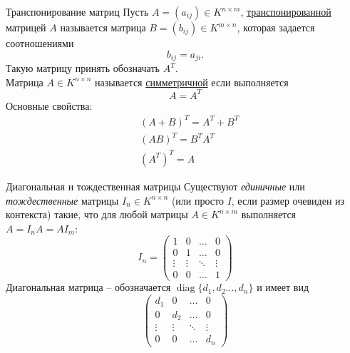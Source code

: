\documentclass[10pt, handout]{beamer}
\DeclareMathOperator{\diag}{diag}
\begin{document}
\begin{frame}{Транспонирование матриц}
Пусть $A=(a_{ij})\in K^{n\times m}$, \underline{транспонированной} матрицей $A$ называется матрица $B=(b_{ij})\in K^{m\times n}$, которая задается соотношениями
$$
b_{ij}=a_{ji}.
$$
Такую матрицу принять обозначать $A^T$.\\
\vspace{1em}
\pause
Матрица $A\in K^{n\times n}$ называется \underline{симметричной} если выполняется
$$
A=A^T
$$
\pause
Основные свойства:
\begin{align*}
&(A+B)^T=A^T+B^T\\
&(AB)^T=B^TA^T\\
&(A^T)^T=A
\end{align*}
\end{frame}

\begin{frame}{Диагональная и тождественная матрицы}
Существуют \textit{единичные} или \textit{тождественные} матрицы $I_n\in K^{n\times n}$ (или просто $I$, если размер очевиден из контекста) такие, что для любой матрицы $A\in K^{n\times m}$ выполняется $A=I_nA=AI_m$:
$$
I_n=\left(\begin{array}{ccccc}
1 & 0 & \ldots & 0 \\
0 & 1 & \ldots & 0 \\
\vdots & \vdots & \ddots & \vdots \\
0 & 0 & \ldots & 1
\end{array}
\right)
$$
\pause
Диагональная матрица -- обозначается $\diag\{d_1, d_2 \ldots, d_n\}$ и имеет вид
$$
\left(\begin{array}{ccccc}
d_1 & 0 & \ldots & 0 \\
0 & d_2 & \ldots & 0 \\
\vdots & \vdots & \ddots & \vdots \\
0 & 0 & \ldots & d_n
\end{array}
\right)
$$
\end{frame}
\end{document}
